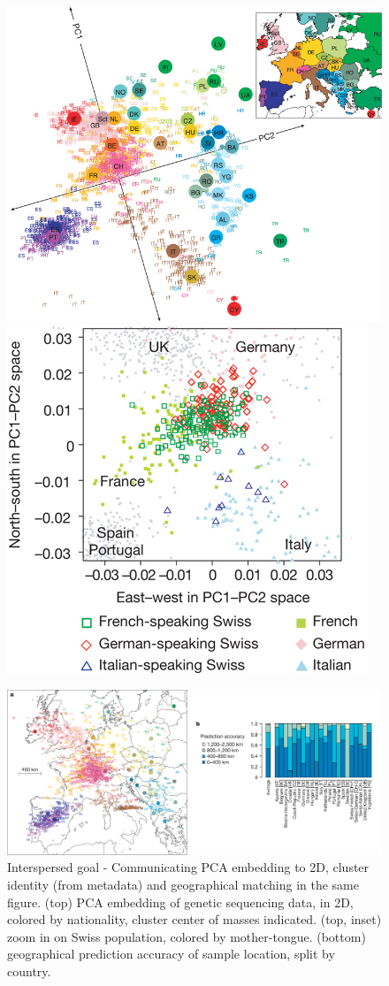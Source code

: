 \documentclass[11pt]{article}
\begin{document}
\begin{figure}[h!]
\begin{center}
\includegraphics[width=0.62\linewidth]{genetics-pca-europe-map}\hspace{-1cm}\includegraphics[width=0.32\linewidth]{genetics-pca-europe-swiss}

\vspace{0.5cm}
\includegraphics[width=0.75\linewidth]{genetics-pca-europe-cvpred}
\caption{Interspersed goal - Communicating PCA embedding to 2D, cluster identity (from metadata) and geographical matching in the same figure. (top) PCA embedding of genetic sequencing data, in 2D, colored by nationality, cluster center of masses indicated. (top, inset) zoom in on Swiss population, colored by mother-tongue. (bottom) geographical prediction accuracy of sample location, split by country.  }
\end{center}
\end{figure} 

\clearpage
\end{document}
